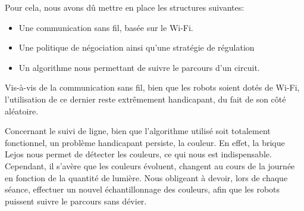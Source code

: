 \documentclass[french,a4paper,12pt]{report}
\begin{document}
Pour cela, nous avons dû mettre en place les structures suivantes:
\begin{itemize}
\item Une communication sans fil, basée sur le Wi-Fi.

\item Une politique de négociation ainsi qu'une stratégie de régulation

\item Un algorithme nous permettant de suivre le parcours d'un circuit.
\end{itemize}

Vis-à-vis de la communication sans fil, bien que les robots soient dotés de Wi-Fi, l'utilisation de ce dernier reste extrêmement handicapant, du fait de son côté aléatoire.

Concernant le suivi de ligne, bien que l'algorithme utilisé soit totalement fonctionnel, un problème handicapant persiste, la couleur. En effet, la brique Lejos nous permet de détecter les couleurs, ce qui nous est indispensable. Cependant, il s'avère que les couleurs évoluent, changent au cours de la journée en fonction de la quantité de lumière. Nous obligeant à devoir, lors de chaque séance, effectuer un nouvel échantillonnage des couleurs, afin que les robots puissent suivre le parcours sans dévier.
\end{document}
